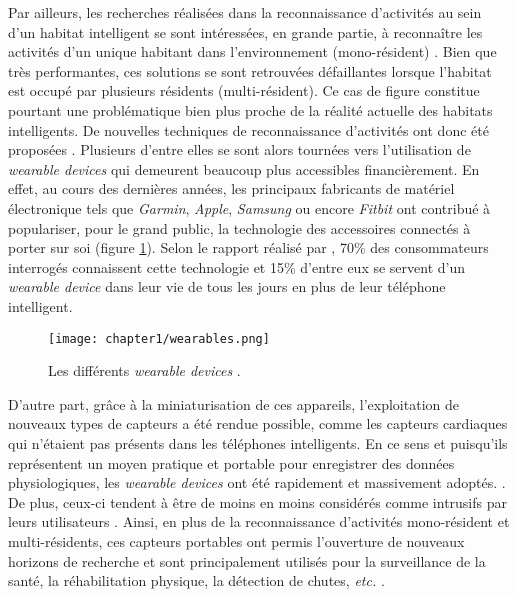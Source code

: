 {{Par ailleurs, les recherches réalisées dans la reconnaissance d'activités au sein d'un habitat intelligent se sont intéressées, en grande partie, à reconnaître les activités d'un unique habitant dans l'environnement (mono-résident) \citep{VikramadityaJakkula2007, VanKasteren2008, Inomata2009, Ghazvininejad2011, Belley2014, Fortin-Simard2015}. Bien que très performantes, ces solutions se sont retrouvées défaillantes lorsque l'habitat est occupé par plusieurs résidents (multi-résident). Ce cas de figure constitue pourtant une problématique bien plus proche de la réalité actuelle des habitats intelligents. De nouvelles techniques de reconnaissance d'activités ont donc été proposées \citep{Crandall2009, Cook2009, Alemdar2013, Ayuningtyas2014, Emi2015, Mokhtari2018}. Plusieurs d'entre elles \citep{Mihailidis2004, Tunca2014} se sont alors tournées vers l'utilisation de \textit{wearable devices} qui demeurent beaucoup plus accessibles financièrement. En effet, au cours des dernières années, les principaux fabricants de matériel électronique tels que \textit{Garmin}, \textit{Apple}, \textit{Samsung} ou encore \textit{Fitbit} ont contribué à populariser, pour le grand public, la technologie des accessoires connectés à porter sur soi (figure \ref{fig:wearables}). Selon le rapport réalisé par \cite{Nielsen2014}, 70\% des consommateurs interrogés connaissent cette technologie et 15\% d'entre eux se servent d'un \textit{wearable device} dans leur vie de tous les jours en plus de leur téléphone intelligent.

\begin{figure}[H]
	\centering
	\texttt{[image: chapter1/wearables.png]}
	\caption[Les différents \textit{wearable devices}.]{Les différents \textit{wearable devices} \citep{Huifeng2020}.}
	\label{fig:wearables}
\end{figure}

D'autre part, grâce à la miniaturisation de ces appareils, l'exploitation de nouveaux types de capteurs a été rendue possible, comme les capteurs cardiaques qui n'étaient pas présents dans les téléphones intelligents. En ce sens et puisqu'ils représentent un moyen pratique et portable pour enregistrer des données physiologiques, les \textit{wearable devices} ont été rapidement et massivement adoptés. \citep{NPDGroup2015}. De plus, ceux-ci tendent à être de moins en moins considérés comme intrusifs par leurs utilisateurs \citep{Gaskin2017}. Ainsi, en plus de la reconnaissance d'activités mono-résident et multi-résidents, ces capteurs portables ont permis l'ouverture de nouveaux horizons de recherche et sont principalement utilisés pour la surveillance de la santé, la réhabilitation physique, la détection de chutes, \textit{etc.} \citep{Patel2012, Mukhopadhyay2014, Delahoz2014}.

}}
